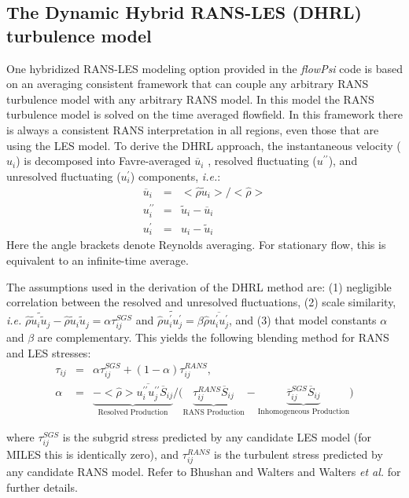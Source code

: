 \subsection{The Dynamic Hybrid RANS-LES (DHRL) turbulence model}

One hybridized RANS-LES modeling option provided in the {\it flowPsi}
code is based on an averaging consistent framework that can couple any
arbitrary RANS turbulence model with any arbitrary RANS model.  In
this model the RANS turbulence model is solved on the time averaged
flowfield.  In this framework there is always a consistent RANS
interpretation in all regions, even those that are using the LES
model.  To derive the DHRL approach, the instantaneous velocity
($u_i$) is decomposed into Favre-averaged $\overline{u}_i$ , resolved
fluctuating ($u^{\prime\prime}$), and unresolved fluctuating
($u^\prime_i$) components, {\it i.e.}:
\begin{eqnarray}
\overline{u}_i &=& <\hat{\rho} \tilde{u}_i>/<\hat{\rho}>\\
u^{\prime\prime}_i &=& \tilde{u}_i - \overline{u}_i\\
u^\prime_i &=& u_i - \tilde{u}_i
\end{eqnarray}
Here the angle brackets denote Reynolds averaging.  For stationary flow, this is equivalent to an infinite-time average.

The assumptions used in the derivation of the DHRL method are: (1)
negligible correlation between the resolved and unresolved
fluctuations, (2) scale similarity, {\it i.e.}
$\hat{\rho}\widetilde{\tilde{u}_i\tilde{u}_j} -
\hat{\rho}\tilde{u}_i\tilde{u}_j = \alpha \tau^{SGS}_{ij}$ and
$\hat{\rho}\widetilde{u^\prime_i u^\prime_j} = \beta
\hat{\rho}\overline{u^{\prime}_i u^{\prime}_j}$, and (3) that model
constants $\alpha$ and $\beta$ are complementary.  This yields the
following blending method for RANS and LES stresses:
\begin{eqnarray}
\label{eq:dhrlblend}
\tau_{ij} &=& \alpha \tau^{SGS}_{ij} + (1-\alpha)\tau^{RANS}_{ij},\\
\alpha &=& \underbrace{-<\hat{\rho}> \overline{u^{\prime\prime}_i u^{\prime\prime}_j} \overline{S}_{ij}}_{\text{Resolved Production}}/ \Bigg(\underbrace{\tau^{RANS}_{ij} \overline S_{ij}}_{\text{RANS Production}} - \underbrace{ \overline{\tau}^{SGS}_{ij} \overline{S}_{ij}}_{\text{Inhomogeneous Production}}\Bigg)
\label{eq:dhrlswitch}
\end{eqnarray}

where $\tau^{SGS}_{ij}$ is the subgrid stress predicted by any
candidate LES model (for MILES this is identically zero), and
$\tau^{RANS}_{ij}$ is the turbulent stress predicted by any candidate
RANS model. Refer to Bhushan and Walters\cite{Bhushan.2012} and Walters
{\it et al.} \cite{Walters.2013} for further details.

